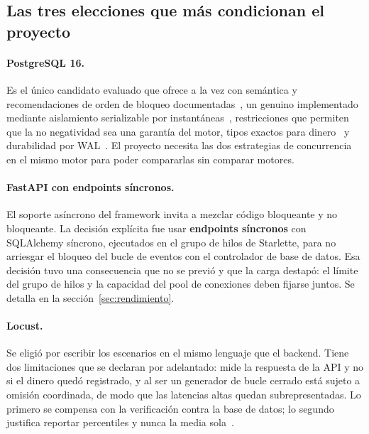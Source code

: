 \subsection{Las tres elecciones que más condicionan el proyecto}

\paragraph{PostgreSQL 16.} Es el único candidato evaluado que ofrece a la vez
 con semántica y recomendaciones de orden de bloqueo
documentadas~\cite{pg16lock}, un  genuino implementado
mediante aislamiento serializable por instantáneas~\cite{ports2012},
restricciones  que permiten que la no negatividad sea una
garantía del motor, tipos exactos para dinero~\cite{pg16money} y durabilidad
por WAL~\cite{pg16wal}. El proyecto necesita las dos estrategias de
concurrencia en el mismo motor para poder compararlas sin comparar motores.

\paragraph{FastAPI con endpoints síncronos.} El soporte asíncrono del
framework invita a mezclar código bloqueante y no bloqueante. La decisión
explícita fue usar \textbf{endpoints síncronos} con SQLAlchemy síncrono,
ejecutados en el grupo de hilos de Starlette, para no arriesgar el bloqueo del
bucle de eventos con el controlador de base de datos. Esa decisión tuvo una
consecuencia que no se previó y que la carga destapó: el límite del grupo de
hilos y la capacidad del pool de conexiones deben fijarse juntos. Se detalla
en la sección~\ref{sec:rendimiento}.

\paragraph{Locust.} Se eligió por escribir los escenarios en el mismo lenguaje
que el backend. Tiene dos limitaciones que se declaran por adelantado: mide la
respuesta de la API y no si el dinero quedó registrado, y al ser un generador
de bucle cerrado está sujeto a omisión coordinada, de modo que las latencias
altas quedan subrepresentadas. Lo primero se compensa con la verificación
contra la base de datos; lo segundo justifica reportar percentiles y nunca la
media sola~\cite{dean2013}.


